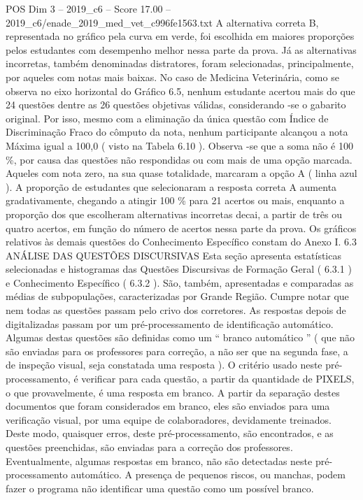 \begin{textsample}{POS Dim 3 – 2019\_c6 – Score 17.00 – 2019\_c6/enade\_2019\_med\_vet\_c996fe1563.txt}
A alternativa correta B, representada no gráfico pela curva em verde, foi escolhida em maiores proporções pelos estudantes com desempenho melhor nessa parte da prova.
Já as alternativas incorretas, também denominadas distratores, foram selecionadas, principalmente, por aqueles com notas mais baixas.
No caso de Medicina Veterinária, como se observa no eixo horizontal do Gráfico 6.5, nenhum estudante acertou mais do que 24 questões dentre as 26 questões objetivas válidas, considerando -se o gabarito original.
Por isso, mesmo com a eliminação da única questão com Índice de Discriminação Fraco do cômputo da nota, nenhum participante alcançou a nota Máxima igual a 100,0 ( visto na Tabela 6.10 ).
Observa -se que a soma não é 100 \%, por causa das questões não respondidas ou com mais de uma opção marcada.
Aqueles com nota zero, na sua quase totalidade, marcaram a opção A ( linha azul ).
A proporção de estudantes que selecionaram a resposta correta A aumenta gradativamente, chegando a atingir 100 \% para 21 acertos ou mais, enquanto a proporção dos que escolheram alternativas incorretas decai, a partir de três ou quatro acertos, em função do número de acertos nessa parte da prova.
Os gráficos relativos às demais questões do Conhecimento Específico constam do Anexo I. 6.3 ANÁLISE DAS QUESTÕES DISCURSIVAS Esta seção apresenta estatísticas selecionadas e histogramas das Questões Discursivas de Formação Geral ( 6.3.1 ) e Conhecimento Específico ( 6.3.2 ).
São, também, apresentadas e comparadas as médias de subpopulações, caracterizadas por Grande Região.
Cumpre notar que nem todas as questões passam pelo crivo dos corretores.
As respostas depois de digitalizadas passam por um pré-processamento de identificação automático.
Algumas destas questões são definidas como um “ branco automático ” ( que não são enviadas para os professores para correção, a não ser que na segunda fase, a de inspeção visual, seja constatada uma resposta ).
O critério usado neste pré-processamento, é verificar para cada questão, a partir da quantidade de PIXELS, o que provavelmente, é uma resposta em branco.
A partir da separação destes documentos que foram considerados em branco, eles são enviados para uma verificação visual, por uma equipe de colaboradores, devidamente treinados.
Deste modo, quaisquer erros, deste pré-processamento, são encontrados, e as questões preenchidas, são enviadas para a correção dos professores.
Eventualmente, algumas respostas em branco, não são detectadas neste pré-processamento automático.
A presença de pequenos riscos, ou manchas, podem fazer o programa não identificar uma questão como um possível branco.

\end{textsample}
